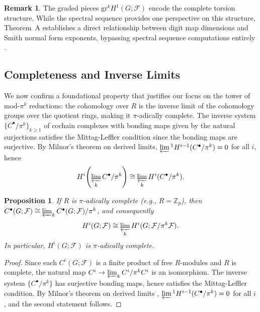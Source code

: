 \documentclass[11pt]{amsart}
\theoremstyle{plain}
\newtheorem{proposition}[theorem]{Proposition}
\theoremstyle{definition}
\newtheorem{remark}[theorem]{Remark}
\newcommand{\Zp}{\mathbb{Z}_p}                        %
\newcommand{\Ring}{R}                          %
\newcommand{\unif}{\pi}                        %
\newcommand{\sheaf}[1]{\mathcal{#1}}                  %
\newcommand{\gr}{\mathrm{gr}}                         %
\begin{document}
\begin{remark}
\label{rem:graded-structure}
The graded pieces $\gr^k H^1(G; \sheaf{F})$ encode the complete torsion structure. While the spectral sequence provides one perspective on this structure, Theorem~A establishes a direct relationship between digit map dimensions and Smith normal form exponents, bypassing spectral sequence computations entirely \cite{McCleary2000}.
\end{remark}

\subsection{Completeness and Inverse Limits}
\label{ssec:completeness}

We now confirm a foundational property that justifies our focus on the tower of 
mod-$\unif^k$ reductions: the cohomology over $\Ring$ is the inverse limit of the cohomology 
groups over the quotient rings, making it $\unif$-adically complete.
The inverse system $\{C^\bullet/\unif^k\}_{k\ge 1}$ of cochain complexes with 
bonding maps given by the natural surjections satisfies the Mittag-Leffler 
condition since the bonding maps are surjective. By Milnor's theorem on derived 
limits, $\varprojlim{}^{1} H^{i-1}(C^\bullet/\unif^k) = 0$ for all $i$, hence
\[
H^i\!\left(\varprojlim_k C^\bullet/\unif^k\right) \cong \varprojlim_k H^i(C^\bullet/\unif^k).
\]

\begin{proposition}
\label{prop:completeness}
If $\Ring$ is $\unif$-adically complete (e.g., $\Ring = \Zp$), then 
$C^\bullet(G;\sheaf{F}) \cong \varprojlim_k C^\bullet(G;\sheaf{F})/\unif^k$, 
and consequently
\[
H^i(G;\sheaf{F}) \cong \varprojlim_{k} H^i(G;\sheaf{F}/\unif^k\sheaf{F}).
\]
In particular, $H^i(G;\sheaf{F})$ is $\unif$-adically complete.
\end{proposition}

\begin{proof}
Since each $C^i(G;\sheaf{F})$ is a finite product of free $\Ring$-modules and 
$\Ring$ is complete, the natural map $C^i \to \varprojlim_k C^i/\unif^k C^i$ is 
an isomorphism. The inverse system $\{C^\bullet/\unif^k\}$ has surjective bonding 
maps, hence satisfies the Mittag-Leffler condition. By Milnor's theorem on derived 
limits \cite{Weibel1994}, $\varprojlim{}^{1} H^{i-1}(C^\bullet/\unif^k) = 0$ 
for all $i$, and the second statement follows.
\end{proof}
\end{document}
